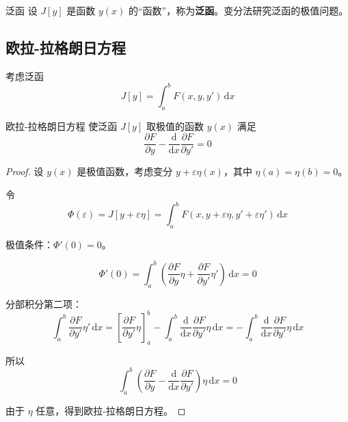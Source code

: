 \begin{dingliyi}{泛函}{}
设 $J[y]$ 是函数 $y(x)$ 的“函数”，称为\textbf{泛函}。变分法研究泛函的极值问题。
\end{dingliyi}

\subsection{欧拉-拉格朗日方程}

考虑泛函
\begin{equation}
    J[y] = \int_a^b F(x, y, y')\,\mathrm{d}x
\end{equation}

\begin{dingli}{欧拉-拉格朗日方程}{}
使泛函 $J[y]$ 取极值的函数 $y(x)$ 满足
\[
    \frac{\partial F}{\partial y} - \frac{\mathrm{d}}{\mathrm{d}x}\frac{\partial F}{\partial y'} = 0
\]
\end{dingli}

\begin{proof}
设 $y(x)$ 是极值函数，考虑变分 $y + \varepsilon\eta(x)$，其中 $\eta(a) = \eta(b) = 0$。

令
\begin{equation}
    \Phi(\varepsilon) = J[y + \varepsilon\eta] = \int_a^b F(x, y + \varepsilon\eta, y' + \varepsilon\eta')\,\mathrm{d}x
\end{equation}

极值条件：$\Phi'(0) = 0$。

\begin{equation}
    \Phi'(0) = \int_a^b \left(\frac{\partial F}{\partial y}\eta + \frac{\partial F}{\partial y'}\eta'\right)\,\mathrm{d}x = 0
\end{equation}

分部积分第二项：
\begin{equation}
    \int_a^b \frac{\partial F}{\partial y'}\eta'\,\mathrm{d}x = \left[\frac{\partial F}{\partial y'}\eta\right]_a^b - \int_a^b \frac{\mathrm{d}}{\mathrm{d}x}\frac{\partial F}{\partial y'}\eta\,\mathrm{d}x = -\int_a^b \frac{\mathrm{d}}{\mathrm{d}x}\frac{\partial F}{\partial y'}\eta\,\mathrm{d}x
\end{equation}

所以
\begin{equation}
    \int_a^b \left(\frac{\partial F}{\partial y} - \frac{\mathrm{d}}{\mathrm{d}x}\frac{\partial F}{\partial y'}\right)\eta\,\mathrm{d}x = 0
\end{equation}

由于 $\eta$ 任意，得到欧拉-拉格朗日方程。
\end{proof}

